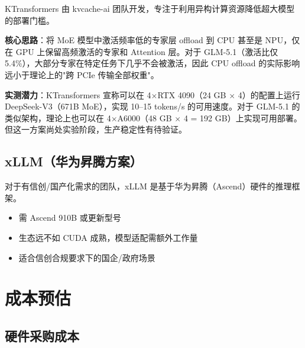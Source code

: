 \documentclass[UTF8,a4paper,10pt,oneside]{ctexart}
\begin{document}
KTransformers 由 kvcache-ai 团队开发，专注于利用异构计算资源降低超大模型的部署门槛。

\textbf{核心思路}：将 MoE 模型中激活频率低的专家层 offload 到 CPU 甚至是 NPU，仅在 GPU 上保留高频激活的专家和 Attention 层。对于 GLM-5.1（激活比仅 5.4\%），大部分专家在特定任务下几乎不会被激活，因此 CPU offload 的实际影响远小于理论上的"跨 PCIe 传输全部权重"。

\textbf{实测潜力}：KTransformers 宣称可以在 4$\times$RTX 4090（24 GB $\times$ 4）的配置上运行 DeepSeek-V3（671B MoE），实现 10--15 tokens/s 的可用速度。对于 GLM-5.1 的类似架构，理论上也可以在 4$\times$A6000（48 GB $\times$ 4 = 192 GB）上实现可用部署。但这一方案尚处实验阶段，生产稳定性有待验证。

\subsection{xLLM（华为昇腾方案）}

对于有信创/国产化需求的团队，xLLM 是基于华为昇腾（Ascend）硬件的推理框架。
\begin{itemize}
    \item 需 Ascend 910B 或更新型号
    \item 生态远不如 CUDA 成熟，模型适配需额外工作量
    \item 适合信创合规要求下的国企/政府场景
\end{itemize}


\section{成本预估}

\subsection{硬件采购成本}
\end{document}
